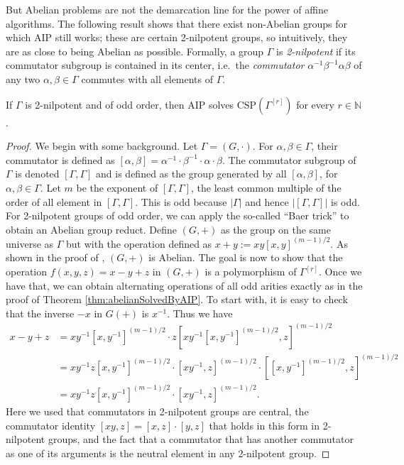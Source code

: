 \documentclass[a4paper,english, thm-restate]{lipics-v2021}
\newcommand{\CSP}[1]{\mathrm{CSP}(#1)}
\newcommand{\bbN}{\mathbb{N}}
\newcommand{\CosetGrpTmplt}[2]{#1^{[#2]}}
\begin{document}
	But Abelian problems are not the demarcation line for the power of affine algorithms. The following result shows that there exist non-Abelian groups for which AIP still works; these are certain 2-nilpotent groups, so intuitively, they are as close to being Abelian as possible. Formally, a group $\Gamma$ is \emph{2-nilpotent} if its commutator subgroup is contained in its center, i.e.\ the \emph{commutator} $\alpha^{-1}\beta^{-1}\alpha\beta$ of any two $\alpha,\beta \in \Gamma$ commutes with all elements of $\Gamma$. 
	\begin{theorem}
		\label{thm:AIPsolvesOdd2nilpotent}
		If $\Gamma$ is 2-nilpotent and of odd order, then AIP solves $\CSP{\CosetGrpTmplt{\Gamma}{r}}$ for every $r \in \bbN$. \end{theorem}
	\begin{proof}
		We begin with some background. Let $\Gamma=(G, \cdot)$. For $\alpha, \beta \in \Gamma$, their commutator is defined as $[\alpha, \beta] = \alpha^{-1}\cdot \beta^{-1} \cdot \alpha \cdot \beta$. The commutator subgroup of $\Gamma$ is denoted $[\Gamma, \Gamma]$ and is defined as the group generated by all $[\alpha, \beta]$, for $\alpha, \beta \in \Gamma$. Let $m$ be the exponent of $[\Gamma,\Gamma]$, the least common multiple of the order of all  element in $[\Gamma,\Gamma]$. This is odd because $|\Gamma|$ and hence $|[\Gamma,\Gamma]|$ is odd.
		For 2-nilpotent groups of odd order, we can apply the so-called ``Baer trick'' \cite{kompatscher2024, Isaacs} to obtain an Abelian group reduct. Define $(G,+)$ as the group on the same universe as $\Gamma$ but with the operation defined as $x + y := xy[x,y]^{(m-1)/2}$. As shown in the proof of \cite[Corollary 5.2]{kompatscher2024}, $(G,+)$ is Abelian. 
		The goal is now to show that the operation $f(x,y,z) = x-y+z$ in $(G,+)$ is a polymorphism of $\CosetGrpTmplt{\Gamma}{r}$. Once we have that, we can obtain alternating operations of all odd arities exactly as in the proof of Theorem \ref{thm:abelianSolvedByAIP}.
		To start with, it is easy to check that the inverse $-x$ in $G(+)$ is $x^{-1}$. Thus we have
		\begin{align*}
			x-y+z &= xy^{-1}[x,y^{-1}]^{(m-1)/2} \cdot z[xy^{-1}[x,y^{-1}]^{(m-1)/2},z]^{(m-1)/2}\\
			&= xy^{-1}z[x,y^{-1}]^{(m-1)/2} \cdot [xy^{-1},z]^{(m-1)/2} \cdot [[x,y^{-1}]^{(m-1)/2},z]^{(m-1)/2}\\
			&= xy^{-1}z[x,y^{-1}]^{(m-1)/2} \cdot [xy^{-1},z]^{(m-1)/2}.
		\end{align*}
		Here we used that commutators in 2-nilpotent groups are central, the commutator identity $[xy,z] = [x,z] \cdot [y,z]$ that holds in this form in 2-nilpotent groups, and the fact that a commutator that has another commutator as one of its arguments is the neutral element in any 2-nilpotent group.

\end{proof}
\end{document}
